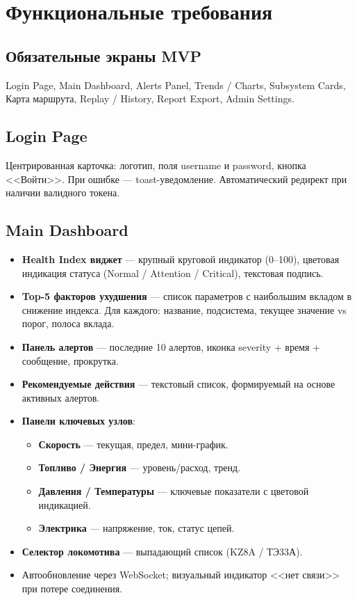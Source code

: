 \documentclass[12pt,a4paper]{article}
\begin{document}
\section{Функциональные требования}

\subsection{Обязательные экраны MVP}

Login Page, Main Dashboard, Alerts Panel, Trends / Charts, Subsystem Cards, Карта маршрута, Replay / History, Report Export, Admin Settings.

\subsection{Login Page}

Центрированная карточка: логотип, поля username и password, кнопка <<Войти>>. При ошибке --- toast-уведомление. Автоматический редирект при наличии валидного токена.

\subsection{Main Dashboard}
\label{sec:dashboard}

\begin{itemize}[nosep]
  \item \textbf{Health Index виджет} --- крупный круговой индикатор (0--100), цветовая индикация статуса (Normal / Attention / Critical), текстовая подпись.
  \item \textbf{Top-5 факторов ухудшения} --- список параметров с наибольшим вкладом в снижение индекса. Для каждого: название, подсистема, текущее значение vs порог, полоса вклада.
  \item \textbf{Панель алертов} --- последние 10 алертов, иконка severity + время + сообщение, прокрутка.
  \item \textbf{Рекомендуемые действия} --- текстовый список, формируемый на основе активных алертов.
  \item \textbf{Панели ключевых узлов}:
    \begin{itemize}[nosep]
      \item \textbf{Скорость} --- текущая, предел, мини-график.
      \item \textbf{Топливо / Энергия} --- уровень/расход, тренд.
      \item \textbf{Давления / Температуры} --- ключевые показатели с цветовой индикацией.
      \item \textbf{Электрика} --- напряжение, ток, статус цепей.
    \end{itemize}
  \item \textbf{Селектор локомотива} --- выпадающий список (KZ8A / ТЭ33А).
  \item Автообновление через WebSocket; визуальный индикатор <<нет связи>> при потере соединения.
\end{itemize}
\end{document}

